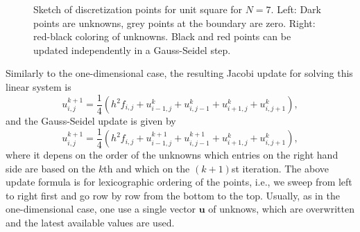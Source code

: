\documentclass[12pt]{article}
\newcommand{\bs}{\boldsymbol}
\begin{document}
\begin{enumerate}
\begin{figure}
 \hspace{5ex}
\caption{Sketch of discretization points for unit square for
  $N=7$. Left: Dark points are unknowns, grey points at the boundary
  are zero. Right: red-black coloring of unknowns. Black and red
  points can be updated independently in a Gauss-Seidel
  step.\label{fig}}
\end{figure}
Similarly to the one-dimensional case, the resulting Jacobi update for
solving this linear system is
\begin{equation*}
  u_{i,j}^{k+1} = \frac{1}{4}\left(h^2 f_{i,j} + u^k_{i-1,j}+ u^k_{i,j-1}+ u^k_{i+1,j}+ u^k_{i,j+1} \right),
\end{equation*}
   and the Gauss-Seidel update is given by
  \begin{equation*}
  u_{i,j}^{k+1} = \frac{1}{4}\left(h^2 f_{i,j} + u^{k+1}_{i-1,j}+
  u^{k+1}_{i,j-1}+ u^k_{i+1,j}+ u^k_{i,j+1} \right),
  \end{equation*}
  where it depens on the order of the unknowns which entries on the
  right hand side are based on the $k$th and which on the $(k+1)$st
  iteration. The above update formula is for lexicographic ordering of
  the points, i.e., we sweep from left to right first and go row by
  row from the bottom to the top.
  Usually, as in the one-dimensional case, one use a single
  vector $\bs u$ of unknows, which are overwritten and the latest
  available values are used.


\end{enumerate}
\end{document}
